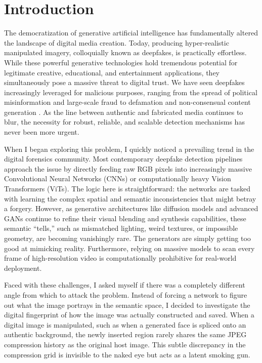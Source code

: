 \section{Introduction}
\label{sec:intro}

The democratization of generative artificial intelligence has fundamentally altered the landscape of digital media creation. Today, producing hyper-realistic manipulated imagery, colloquially known as deepfakes, is practically effortless. While these powerful generative technologies hold tremendous potential for legitimate creative, educational, and entertainment applications, they simultaneously pose a massive threat to digital trust. We have seen deepfakes increasingly leveraged for malicious purposes, ranging from the spread of political misinformation and large-scale fraud to defamation and non-consensual content generation \cite{faceforensics}. As the line between authentic and fabricated media continues to blur, the necessity for robust, reliable, and scalable detection mechanisms has never been more urgent.

When I began exploring this problem, I quickly noticed a prevailing trend in the digital forensics community. Most contemporary deepfake detection pipelines approach the issue by directly feeding raw RGB pixels into increasingly massive Convolutional Neural Networks (CNNs) or computationally heavy Vision Transformers (ViTs). The logic here is straightforward: the networks are tasked with learning the complex spatial and semantic inconsistencies that might betray a forgery. However, as generative architectures like diffusion models and advanced GANs continue to refine their visual blending and synthesis capabilities, these semantic ``tells,'' such as mismatched lighting, weird textures, or impossible geometry, are becoming vanishingly rare. The generators are simply getting too good at mimicking reality. Furthermore, relying on massive models to scan every frame of high-resolution video is computationally prohibitive for real-world deployment.

Faced with these challenges, I asked myself if there was a completely different angle from which to attack the problem. Instead of forcing a network to figure out what the image portrays in the semantic space, I decided to investigate the digital fingerprint of how the image was actually constructed and saved. When a digital image is manipulated, such as when a generated face is spliced onto an authentic background, the newly inserted region rarely shares the same JPEG compression history as the original host image. This subtle discrepancy in the compression grid is invisible to the naked eye but acts as a latent smoking gun.

